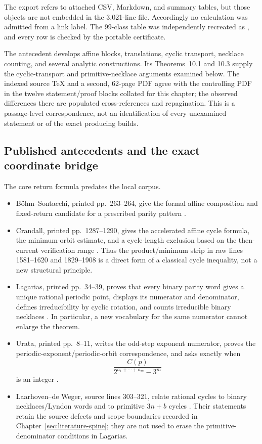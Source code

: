 The export refers to attached CSV, Markdown, and summary tables, but those
objects are not embedded in the 3,021-line file.  Accordingly no calculation
was admitted from a link label.  The 99-class table was independently
recreated as
, and every row is
checked by the portable certificate.

The antecedent develops affine blocks, translations, cyclic transport,
necklace counting, and several analytic constructions.  Its Theorems~10.1
and 10.3 supply the cyclic-transport and primitive-necklace arguments examined
below.  The indexed source TeX and a second, 62-page PDF agree with the
controlling PDF in the twelve statement/proof blocks collated for this
chapter; the observed differences there are populated cross-references and
repagination.  This is a passage-level correspondence, not an identification
of every unexamined statement or of the exact producing builds.

\subsection{Published antecedents and the exact coordinate bridge}

The core return formula predates the local corpus.

\begin{itemize}[leftmargin=2em]
\item B\"ohm--Sontacchi, printed pp.~263--264, give the formal affine
composition and fixed-return candidate for a prescribed parity pattern
\cite{BohmSontacchi1978}.

\item Crandall, printed pp.~1287--1290, gives the accelerated affine cycle
formula, the minimum-orbit estimate, and a cycle-length exclusion based on the
then-current verification range \cite{Crandall1978}.  Thus the product/minimum
strip in raw lines 1581--1620 and 1829--1908 is a direct form of a classical
cycle inequality, not a new structural principle.

\item Lagarias, printed pp.~34--39, proves that every binary parity word gives
a unique rational periodic point, displays its numerator and denominator,
defines irreducibility by cyclic rotation, and counts irreducible binary
necklaces \cite{Lagarias1990}.  In particular, a new vocabulary for the same
numerator cannot enlarge the theorem.

\item Urata, printed pp.~8--11, writes the odd-step exponent numerator,
proves the periodic-exponent/periodic-orbit correspondence, and asks exactly
when
\[
 \frac{C(p)}{2^{a_1+\cdots+a_m}-3^m}
\]
is an integer \cite{Urata2003}.

\item Laarhoven--de Weger, source lines 303--321, relate rational cycles to
binary necklaces/Lyndon words and to primitive $3n+b$ cycles
\cite{LaarhovenDeWeger2012}.  Their statements retain the source defects and
scope boundaries recorded in Chapter~\ref{sec:literature-spine}; they are not
used to erase the primitive-denominator conditions in Lagarias.
\end{itemize}

